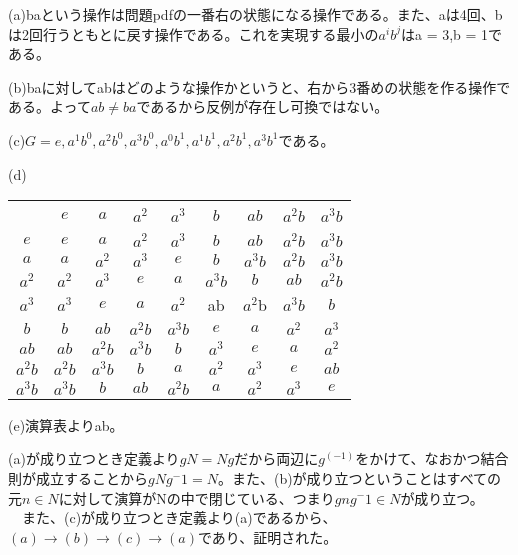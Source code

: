\documentclass[11pt]{jsarticle}
\begin{document}
\par(a)baという操作は問題pdfの一番右の状態になる操作である。また、aは4回、bは2回行うともとに戻す操作である。これを実現する最小の$a^ib^j$はa = 3,b = 1である。
\par(b)baに対してabはどのような操作かというと、右から3番めの状態を作る操作である。よって$ab \neq ba$であるから反例が存在し可換ではない。
\par(c)$G = {e,a^1b^0,a^2b^0,a^3b^0,a^0b^1,a^1b^1,a^2b^1,a^3b^1}$である。
\par(d) \begin{table}[h]
    \begin{tabular}{c|c|c|c|c|c|c|c|c|} \hline
    　 & $e$ & $a$ & $a^2$ & $a^3$ & $b$ & $ab$ & $a^2b$ & $a^3b$ \\
      $e$ & $e$ & $a$ & $a^2$ & $a^3$ & $b$ & $ab$ & $a^2b$ & $a^3b$ \\
      $a$ & $a$ & $a^2$ & $a^3$ & $e$ & $b$ & $a^3b$ & $a^2b$ & $a^3b$ \\
      $a^2$ & $a^2$ & $a^3$ & $e$ & $a$ & $a^3b$ & $b$ & $ab$ & $a^2b$ \\
      $a^3$ & $a^3$ & $e$ & $a$ & $a^2$ & ab & $a^2$b & $a^3b$ & $b$ \\
      $b$ & $b$ & $ab$ & $a^2b$ & $a^3b$ & $e$ & $a$ & $a^2$ & $a^3$\\
      $ab$ & $ab$ & $a^2b$ & $a^3b$ & $b$ & $a^3$ & $e$ & $a$ & $a^2$ \\
      $a^2b$ & $a^2b$ & $a^3b$ & $b$ & $a$ & $a^2$ & $a^3$ & $e$ & $ab$ \\
      $a^3b$ & $a^3b$ & $b$ & $ab$ & $a^2b$ & $a$ & $a^2$ & $a^3$ & $e$ \\
\end{tabular}
\end{table}
\par(e)演算表よりab。\\
\par{}
\par (a)が成り立つとき定義より$gN=Ng$だから両辺に$g^(-1)$をかけて、なおかつ結合則が成立することから$gNg^-1 = N$。また、(b)が成り立つということはすべての元$n \in N$に対して演算がNの中で閉じている、つまり$gng^-1 \in N$が成り立つ。
    　また、(c)が成り立つとき定義より(a)であるから、$(a) \to (b) \to (c) \to (a)$であり、証明された。\\
\end{document}
